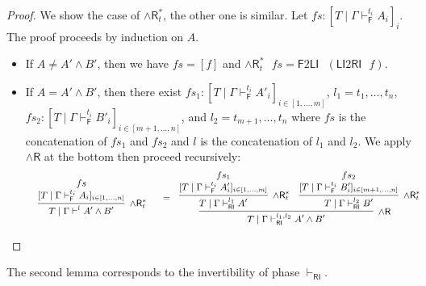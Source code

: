 \documentclass[submission,copyright,creativecommons]{eptcs}
\theoremstyle{definition}
\newcommand{\andr}{\land \mathsf{R}}
\newcommand{\RI}{\mathsf{RI}}
\newcommand{\LI}{\mathsf{LI}}
\newcommand{\F}{\mathsf{F}}
\newcommand{\proofbox}[1]{\begin{tabular}{l} #1 \end{tabular}}
\begin{document}
\begin{proof}
  We show the case of $\andr^{*}_{t}$, the other one is similar.
  Let $fs : [T \mid \Gamma \vdash^{t_i}_{\F} A_i]_i$. The proof proceeds by induction on $A$.
  \begin{itemize}
    \item If $A \neq A' \land B'$, then we have $fs = [ f ]$ and $\andr^*_{t} \text{ } fs = \F 2 \LI \text{ } (\LI 2 \RI \text{ } f)$.
    \item If $A = A' \land B'$, then there exist $fs_1 : [T \mid \Gamma \vdash^{t_i}_{\F} A'_i]_{i \in [1 , \dots , m]}$, $l_1 = t_1 , \dots , t_n$, $fs_2 : [T \mid \Gamma \vdash^{t_i}_{\F} B'_i]_{i \in [m+1 , \dots , n]}$, and $l_2 = t_{m+1} , \dots , t_n$ where $fs$ is the concatenation of $fs_1$ and $fs_2$ and $l$ is the concatenation of $l_1 $ and $l_2$.
    We apply $\andr$ at the bottom then proceed recursively:
    \begin{displaymath}
      \small
      \begin{array}{cc}
        \proofbox{
        \infer[\andr^*_{t}]{T \mid \Gamma \vdash^{l} A' \land B'}{
          \deduce{[T \mid \Gamma \vdash^{t_i}_{\F} A_i]_{i \in [1 , \dots , n]}}{fs}
        }
        }
        &
        =
        \proofbox{
        \infer[\andr]{T \mid \Gamma \vdash^{l_1 , l_2}_{\RI} A' \land B'}{
          \infer[\andr^{*}_{t}]{T \mid \Gamma \vdash^{l_1}_{\RI} A'}{
            \deduce{[T \mid \Gamma \vdash^{t_i}_{\F} A'_i]_{i \in [1 , \dots , m]}}{fs_1}
          }
          &
          \infer[\andr^{*}_{t}]{T \mid \Gamma \vdash^{l_2}_{\RI} B'}{
            \deduce{[T \mid \Gamma \vdash^{t_i}_{\F} B'_i]_{i \in [m+1 , \dots , n]}}{fs_2}
          }
        }
       }
      \end{array}
    \end{displaymath}
  \end{itemize}
\end{proof}

The second lemma corresponds to the invertibility of phase $\vdash_\RI$.
\end{document}
